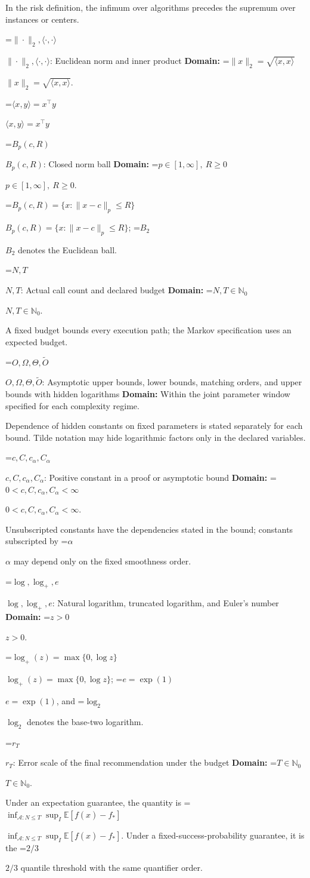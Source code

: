 \documentclass[10pt,a4paper]{article}
\newcommand{\AtlasMath}[1]{\par\begingroup\centering\setbox0=\hbox{$\displaystyle #1$}\ifdim\wd0>1.4\linewidth\typeout{ATLAS WIDE FORMULA: \the\wd0}\fi\ifdim\wd0>\linewidth\resizebox{\linewidth}{!}{\box0}\else\box0\fi\par\endgroup}
\newcommand{\AtlasInlineMath}[1]{\begingroup\setbox0=\hbox{$#1$}\ifdim\wd0>.4\linewidth\endgroup\AtlasMath{#1}\else\endgroup$#1$\fi}
\begin{document}
In the risk definition, the infimum over algorithms precedes the supremum over instances or centers.

\AtlasInlineMath{\|\cdot\|_2,\langle\cdot,\cdot\rangle}: Euclidean norm and inner product \textbf{Domain:} \AtlasInlineMath{\|x\|_2=\sqrt{\langle x,x\rangle}}.

\AtlasInlineMath{\langle x,y\rangle=x^\top y}

\AtlasInlineMath{B_p(c,R)}: Closed norm ball \textbf{Domain:} \AtlasInlineMath{p\in[1,\infty],\ R\ge0}.

\AtlasInlineMath{B_p(c,R)=\{x:\|x-c\|_p\le R\}}; \AtlasInlineMath{B_2} denotes the Euclidean ball.

\AtlasInlineMath{N,T}: Actual call count and declared budget \textbf{Domain:} \AtlasInlineMath{N,T\in\mathbb{N}_0}.

A fixed budget bounds every execution path; the Markov specification uses an expected budget.

\AtlasInlineMath{O,\Omega,\Theta,\widetilde{O}}: Asymptotic upper bounds, lower bounds, matching orders, and upper bounds with hidden logarithms \textbf{Domain:} Within the joint parameter window specified for each complexity regime.

Dependence of hidden constants on fixed parameters is stated separately for each bound. Tilde notation may hide logarithmic factors only in the declared variables.

\AtlasInlineMath{c,C,c_\alpha,C_\alpha}: Positive constant in a proof or asymptotic bound \textbf{Domain:} \AtlasInlineMath{0<c,C,c_\alpha,C_\alpha<\infty}.

Unsubscripted constants have the dependencies stated in the bound; constants subscripted by \AtlasInlineMath{\alpha} may depend only on the fixed smoothness order.

\AtlasInlineMath{\log,\log_+,e}: Natural logarithm, truncated logarithm, and Euler's number \textbf{Domain:} \AtlasInlineMath{z>0}.

\AtlasInlineMath{\log_+(z)=\max\{0,\log z\}}; \AtlasInlineMath{e=\exp(1)}, and \AtlasInlineMath{\log_2} denotes the base-two logarithm.

\AtlasInlineMath{r_T}: Error scale of the final recommendation under the budget \textbf{Domain:} \AtlasInlineMath{T\in\mathbb{N}_0}.

Under an expectation guarantee, the quantity is \AtlasInlineMath{\inf_{\mathcal{A}:N\le T}\sup_I\mathbb{E}[f(\widehat{x})-f_*]}. Under a fixed-success-probability guarantee, it is the \AtlasInlineMath{2/3} quantile threshold with the same quantifier order.
\end{document}
